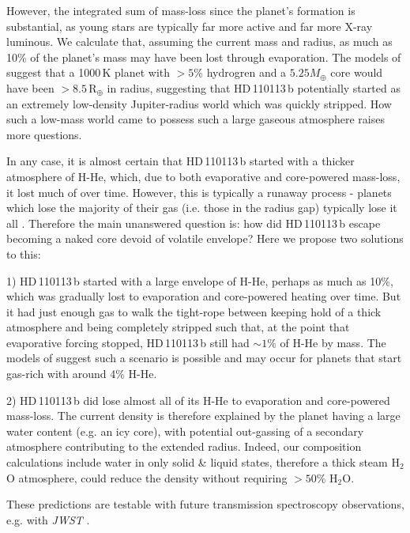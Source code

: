 \documentclass[fleqn,usenatbib]{mnras}
\newcommand{\rearth}{R$_{\oplus}$}
\newcommand{\Tplanet}{HD\,110113\,b}
\begin{document}
However, the integrated sum of mass-loss since the planet's formation is substantial, as young stars are typically far more active and far more X-ray luminous.
We calculate that, assuming the current mass and radius, as much as 10\% of the planet's mass may have been lost through evaporation.
The models of \citet{zeng2019growth} suggest that a 1000\,K planet with $>5$\% hydrogren and a $5.25M_\oplus$ core would have been $>8.5$\,\rearth{} in radius, suggesting that \Tplanet{} potentially started as an extremely low-density Jupiter-radius world which was quickly stripped.
How such a low-mass world came to possess such a large gaseous atmosphere raises more questions.

In any case, it is almost certain that \Tplanet{} started with a thicker atmosphere of H-He, which, due to both evaporative and core-powered mass-loss, it lost much of over time.
However, this is typically a runaway process - planets which lose the majority of their gas (i.e. those in the radius gap) typically lose it all \citep{owen2017evaporation}.
Therefore the main unanswered question is: how did \Tplanet{} escape becoming a naked core devoid of volatile envelope?
Here we propose two solutions to this:

1) \Tplanet{} started with a large envelope of H-He, perhaps as much as 10\%, which was gradually lost to evaporation and core-powered heating over time. 
But it had just enough gas to walk the tight-rope between keeping hold of a thick atmosphere and being completely stripped such that, at the point that evaporative forcing stopped, \Tplanet{} still had $\sim1\%$ of H-He by mass.
The models of \citet[][Figure 5.]{rogers2020unveiling} suggest such a scenario is possible and may occur for planets that start gas-rich with around 4\% H-He.

2) \Tplanet{} did lose almost all of its H-He to evaporation and core-powered mass-loss.
The current density is therefore explained by the planet having a large water content (e.g. an icy core), with potential out-gassing of a secondary atmosphere contributing to the extended radius.
Indeed, our composition calculations include water in only solid \& liquid states, therefore a thick steam \citep[or supercritical;][]{mousis2020irradiated} H$_{2}$O atmosphere, could reduce the density without requiring $>50\%$ H$_{2}$O.

These predictions are testable with future transmission spectroscopy observations, e.g. with \textit{JWST} \citep{2016ApJ...817...17G,2014PASP..126.1134B}.
\end{document}
